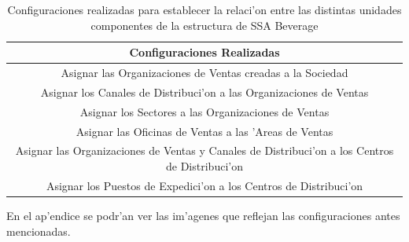 \begin{table}[htb]
\footnotesize
\begin{tabular}{|c|}
\hline
\textbf{Configuraciones Realizadas}\\
\hline
 Asignar las Organizaciones de Ventas creadas a la Sociedad\\
\hline
Asignar los Canales de Distribuci'on a las Organizaciones de Ventas\\
\hline
Asignar los Sectores a las Organizaciones de Ventas \\
\hline
Asignar las Oficinas de Ventas a las 'Areas de Ventas\\
\hline
Asignar las Organizaciones de Ventas y Canales de Distribuci'on a los Centros de Distribuci'on\\
\hline
Asignar los Puestos de Expedici'on a los Centros de Distribuci'on\\
\hline
\end{tabular}
\caption{Configuraciones realizadas para establecer la relaci'on entre las distintas unidades componentes de la estructura de SSA Beverage}
\label{tb:asignaciones}
\end{table}
En el ap'endice se podr'an ver las im'agenes que reflejan las configuraciones antes mencionadas.
